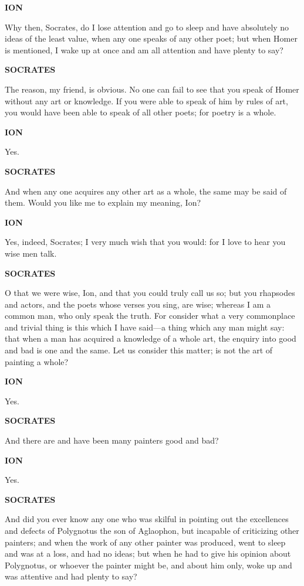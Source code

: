 \documentclass[11pt,letter]{article}
\begin{document}
\par \textbf{ION}
\par   Why then, Socrates, do I lose attention and go to sleep and have absolutely no ideas of the least value, when any one speaks of any other poet; but when Homer is mentioned, I wake up at once and am all attention and have plenty to say?

\par \textbf{SOCRATES}
\par   The reason, my friend, is obvious. No one can fail to see that you speak of Homer without any art or knowledge. If you were able to speak of him by rules of art, you would have been able to speak of all other poets; for poetry is a whole.

\par \textbf{ION}
\par   Yes.

\par \textbf{SOCRATES}
\par   And when any one acquires any other art as a whole, the same may be said of them. Would you like me to explain my meaning, Ion?

\par \textbf{ION}
\par   Yes, indeed, Socrates; I very much wish that you would:  for I love to hear you wise men talk.

\par \textbf{SOCRATES}
\par   O that we were wise, Ion, and that you could truly call us so; but you rhapsodes and actors, and the poets whose verses you sing, are wise; whereas I am a common man, who only speak the truth. For consider what a very commonplace and trivial thing is this which I have said—a thing which any man might say:  that when a man has acquired a knowledge of a whole art, the enquiry into good and bad is one and the same. Let us consider this matter; is not the art of painting a whole?

\par \textbf{ION}
\par   Yes.

\par \textbf{SOCRATES}
\par   And there are and have been many painters good and bad?

\par \textbf{ION}
\par   Yes.

\par \textbf{SOCRATES}
\par   And did you ever know any one who was skilful in pointing out the excellences and defects of Polygnotus the son of Aglaophon, but incapable of criticizing other painters; and when the work of any other painter was produced, went to sleep and was at a loss, and had no ideas; but when he had to give his opinion about Polygnotus, or whoever the painter might be, and about him only, woke up and was attentive and had plenty to say?
\end{document}
